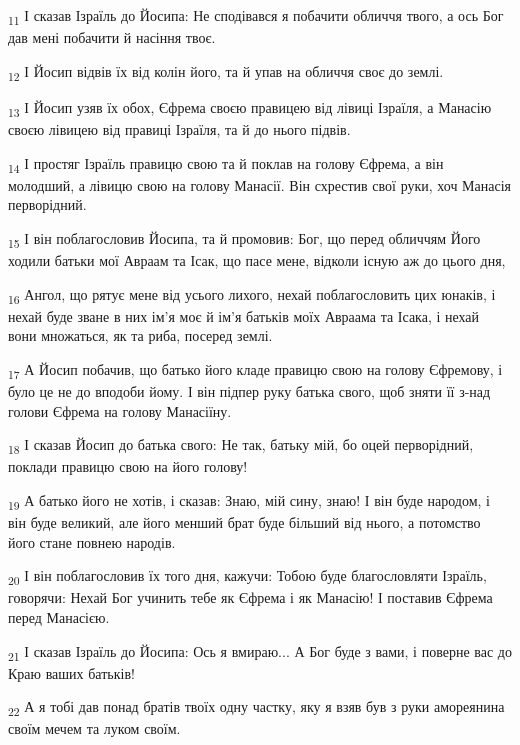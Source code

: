 \begin{tcolorbox}
\textsubscript{11} І сказав Ізраїль до Йосипа: Не сподівався я побачити обличчя твого, а ось Бог дав мені побачити й насіння твоє.
\end{tcolorbox}
\begin{tcolorbox}
\textsubscript{12} І Йосип відвів їх від колін його, та й упав на обличчя своє до землі.
\end{tcolorbox}
\begin{tcolorbox}
\textsubscript{13} І Йосип узяв їх обох, Єфрема своєю правицею від лівиці Ізраїля, а Манасію своєю лівицею від правиці Ізраїля, та й до нього підвів.
\end{tcolorbox}
\begin{tcolorbox}
\textsubscript{14} І простяг Ізраїль правицю свою та й поклав на голову Єфрема, а він молодший, а лівицю свою на голову Манасії. Він схрестив свої руки, хоч Манасія перворідний.
\end{tcolorbox}
\begin{tcolorbox}
\textsubscript{15} І він поблагословив Йосипа, та й промовив: Бог, що перед обличчям Його ходили батьки мої Авраам та Ісак, що пасе мене, відколи існую аж до цього дня,
\end{tcolorbox}
\begin{tcolorbox}
\textsubscript{16} Ангол, що рятує мене від усього лихого, нехай поблагословить цих юнаків, і нехай буде зване в них ім'я моє й ім'я батьків моїх Авраама та Ісака, і нехай вони множаться, як та риба, посеред землі.
\end{tcolorbox}
\begin{tcolorbox}
\textsubscript{17} А Йосип побачив, що батько його кладе правицю свою на голову Єфремову, і було це не до вподоби йому. І він підпер руку батька свого, щоб зняти її з-над голови Єфрема на голову Манасіїну.
\end{tcolorbox}
\begin{tcolorbox}
\textsubscript{18} І сказав Йосип до батька свого: Не так, батьку мій, бо оцей перворідний, поклади правицю свою на його голову!
\end{tcolorbox}
\begin{tcolorbox}
\textsubscript{19} А батько його не хотів, і сказав: Знаю, мій сину, знаю! І він буде народом, і він буде великий, але його менший брат буде більший від нього, а потомство його стане повнею народів.
\end{tcolorbox}
\begin{tcolorbox}
\textsubscript{20} І він поблагословив їх того дня, кажучи: Тобою буде благословляти Ізраїль, говорячи: Нехай Бог учинить тебе як Єфрема і як Манасію! І поставив Єфрема перед Манасією.
\end{tcolorbox}
\begin{tcolorbox}
\textsubscript{21} І сказав Ізраїль до Йосипа: Ось я вмираю... А Бог буде з вами, і поверне вас до Краю ваших батьків!
\end{tcolorbox}
\begin{tcolorbox}
\textsubscript{22} А я тобі дав понад братів твоїх одну частку, яку я взяв був з руки амореянина своїм мечем та луком своїм.
\end{tcolorbox}
